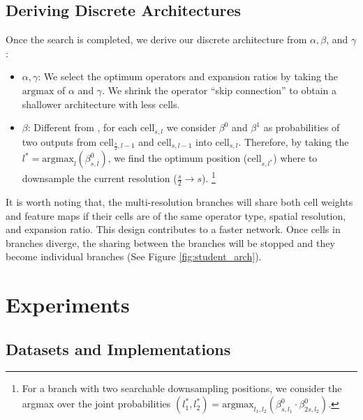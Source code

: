 \documentclass{article} \usepackage{iclr2020_conference,times}
\begin{document}
\subsection{Deriving Discrete Architectures}\label{sec:decoding}
Once the search is completed, we derive our discrete architecture from $\alpha, \beta$, and $\gamma$:

\begin{itemize}[leftmargin=*]
    \vspace{-1em}
    \item \textbf{$\alpha, \gamma$}: We select the optimum operators and expansion ratios by taking the $\mathrm{argmax}$ of $\alpha$ and $\gamma$. We shrink the operator ``skip connection'' to obtain a shallower architecture with less cells.
    \item \textbf{$\beta$}: Different from \citep{liu2019auto}, for each $\mathrm{cell}_{s, l}$ we consider $\beta^0$ and $\beta^1$ as probabilities of two outputs from $\mathrm{cell}_{\frac{s}{2}, l-1}$ and $\mathrm{cell}_{s, l-1}$ into $\mathrm{cell}_{s, l}$. Therefore, by taking the $l^* = \mathrm{argmax}_l(\beta^0_{s,l})$,
we find the optimum position ($\mathrm{cell}_{s, l^*}$) where to downsample the current resolution ($\frac{s}{2} \rightarrow s$). \footnote{For a branch with two searchable downsampling positions, we consider the argmax over the joint probabilities $(l_1^*,l_2^*) = \mathrm{argmax}_{l_1,l_2}(\beta^0_{s,l_1}\cdot \beta^0_{2s,l_2})$.} \vspace{-0.5em}
\end{itemize}

It is worth noting that, the multi-resolution branches will share both cell weights and feature maps if their cells are of the same operator type, spatial resolution, and expansion ratio. This design contributes to a faster network. Once cells in branches diverge, the sharing between the branches will be stopped and they become individual branches (See Figure \ref{fig:student_arch}).


\section{Experiments}\vspace{-0.5em}

\subsection{Datasets and Implementations}\vspace{-0.5em}
\end{document}
